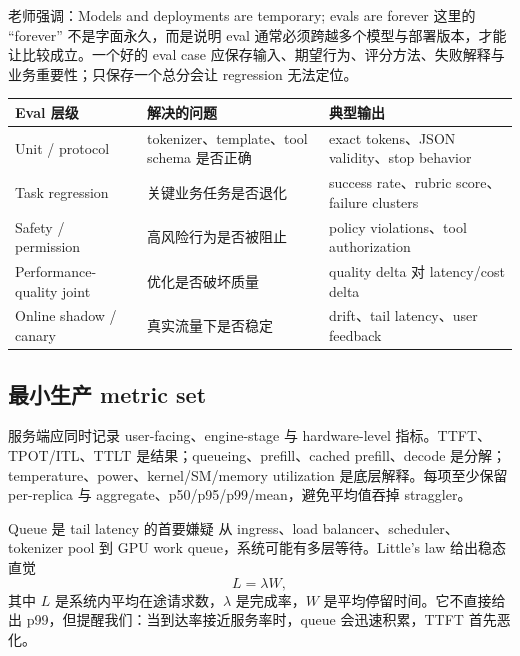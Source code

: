 \begin{importantbox}{老师强调：Models and deployments are temporary; evals are forever}
这里的 “forever” 不是字面永久，而是说明 eval 通常必须跨越多个模型与部署版本，才能让比较成立。一个好的 eval case 应保存输入、期望行为、评分方法、失败解释与业务重要性；只保存一个总分会让 regression 无法定位。
\end{importantbox}

\begin{center}
\small
\begin{tabularx}{\textwidth}{L{2.8cm}YY}
\toprule
Eval 层级 & 解决的问题 & 典型输出 \\
\midrule
Unit / protocol & tokenizer、template、tool schema 是否正确 & exact tokens、JSON validity、stop behavior \\
Task regression & 关键业务任务是否退化 & success rate、rubric score、failure clusters \\
Safety / permission & 高风险行为是否被阻止 & policy violations、tool authorization \\
Performance-quality joint & 优化是否破坏质量 & quality delta 对 latency/cost delta \\
Online shadow / canary & 真实流量下是否稳定 & drift、tail latency、user feedback \\
\bottomrule
\end{tabularx}
\end{center}

\subsection{最小生产 metric set}

服务端应同时记录 user-facing、engine-stage 与 hardware-level 指标。TTFT、TPOT/ITL、TTLT 是结果；queueing、prefill、cached prefill、decode 是分解；temperature、power、kernel/SM/memory utilization 是底层解释。每项至少保留 per-replica 与 aggregate、p50/p95/p99/mean，避免平均值吞掉 straggler。


\begin{knowledgebox}{Queue 是 tail latency 的首要嫌疑}
从 ingress、load balancer、scheduler、tokenizer pool 到 GPU work queue，系统可能有多层等待。Little's law 给出稳态直觉
\[
L=\lambda W,
\]
其中 $L$ 是系统内平均在途请求数，$\lambda$ 是完成率，$W$ 是平均停留时间。它不直接给出 p99，但提醒我们：当到达率接近服务率时，queue 会迅速积累，TTFT 首先恶化。
\end{knowledgebox}

